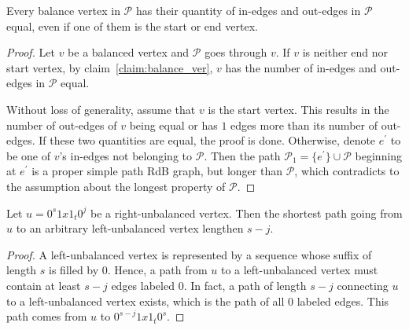 \begin{claim}\label{claim:balance_ver}
    Every balance vertex in $\mathscr{P}$ has their quantity of in-edges and out-edges in $\mathscr{P}$ equal, even if one of them is the start or end vertex.
\end{claim}
\begin{proof}
    Let $v$ be a balanced vertex and $\mathscr{P}$ goes through $v$. If $v$ is neither end nor start vertex, by claim~\ref{claim:balance_ver}, $v$ has the number of in-edges and out-edges in $\mathscr{P}$ equal. 
    
    Without loss of generality, assume that $v$ is the start vertex. This results in the number of out-edges of $v$ being equal or has $1$ edges more than its number of out-edges. If these two quantities are equal, the proof is done. Otherwise, denote $e^{\prime}$ to be one of $v$'s in-edges not belonging to $\mathscr{P}$. Then the path $\mathscr{P}_{1} = \{e^{\prime}\}\cup\mathscr{P}$ beginning at $e^{\prime}$ is a proper simple path RdB graph, but longer than $\mathscr{P}$, which contradicts to the assumption about the longest property of $\mathscr{P}$.
\end{proof}
\begin{claim}\label{claim:shortes_right-left}
    Let $u=0^{s}1x1_{t}0^{j}$ be a right-unbalanced vertex. Then the shortest path going from $u$ to an arbitrary left-unbalanced vertex lengthen $s-j$.
\end{claim}
\begin{proof}
    A left-unbalanced vertex is represented by a sequence whose suffix of length $s$ is filled by $0$. Hence, a path from $u$ to a left-unbalanced vertex must contain at least $s-j$ edges labeled $0$. In fact, a path of length $s-j$ connecting $u$ to a left-unbalanced vertex exists, which is the path of all $0$ labeled edges. This path comes from $u$ to $0^{s-j}1x1_{t}0^{s}$.
\end{proof}
    

